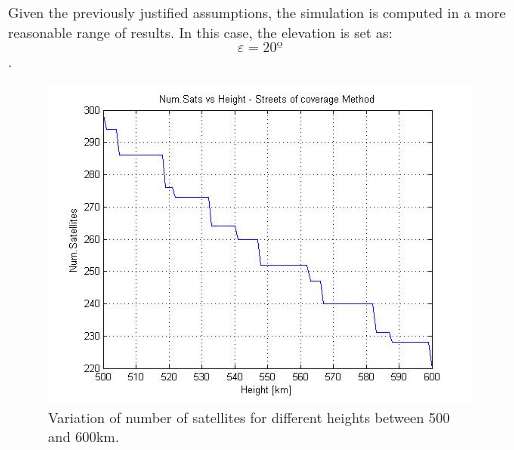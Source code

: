 

Given the previously justified assumptions, the simulation is computed in a more reasonable range of results. In this case, the elevation is set as: $$\varepsilon = 20º$$.

\begin{figure}[H]
\begin{center}
\includegraphics[scale=0.7]{PolarOrbits/Polar.jpg}
\caption{Variation of number of satellites for different heights between 500 and 600km.}
\end{center}
\end{figure}


%
%